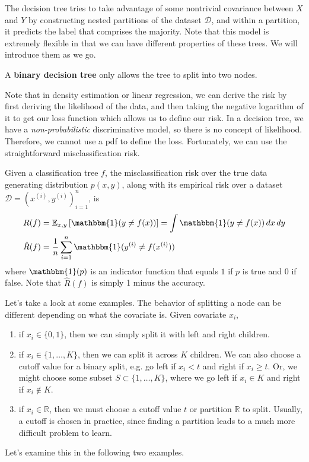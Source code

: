   The decision tree tries to take advantage of some nontrivial covariance between $X$ and $Y$ by constructing nested partitions of the dataset $\mathcal{D}$, and within a partition, it predicts the label that comprises the majority. Note that this model is extremely flexible in that we can have different properties of these trees. We will introduce them as we go. 

  \begin{definition}
    A \textbf{binary decision tree} only allows the tree to split into two nodes. 
  \end{definition} 

  Note that in density estimation or linear regression, we can derive the risk by first deriving the likelihood of the data, and then taking the negative logarithm of it to get our loss function which allows us to define our risk. In a decision tree, we have a \textit{non-probabilistic} discriminative model, so there is no concept of likelihood. Therefore, we cannot use a pdf to define the loss. Fortunately, we can use the straightforward misclassification risk. 

  \begin{theorem}
    Given a classification tree $f$, the misclassification risk over the true data generating distribution $p(x, y)$, along with its empirical risk over a dataset $\mathcal{D} = (x^{(i)}, y^{(i)})_{i=1}^n$, is 
    \begin{align}
      R(f) & = \mathbb{E}_{x, y} \left[ \mathbbm{1} (y \neq f(x))\right] = \int \mathbbm{1} (y \neq f(x)) \, dx \,dy \\ 
      \hat{R}(f) & = \frac{1}{n} \sum_{i=1}^n \mathbbm{1} (y^{(i)} \neq f(x^{(i)}))
    \end{align}
    where $\mathbbm{1}(p)$ is an indicator function that equals $1$ if $p$ is true and $0$ if false. Note that $\hat{R}(f)$ is simply 1 minus the accuracy. 
  \end{theorem} 

  Let's take a look at some examples. The behavior of splitting a node can be different depending on what the covariate is. Given covariate $x_i$, 
  \begin{enumerate}
    \item if $x_i \in \{0, 1\}$, then we can simply split it with left and right children. 
    \item if $x_i \in \{1, \ldots, K\}$, then we can split it across $K$ children. We can also choose a cutoff value for a binary split, e.g. go left if $x_i < t$ and right if $x_i \geq t$. Or, we might choose some subset $S \subset \{1, \ldots, K\}$, where we go left if $x_i \in K$ and right if $x_i \not\in K$. 
    \item if $x_i \in \mathbb{R}$, then we must choose a cutoff value $t$ or partition $\mathbb{R}$ to split. Usually, a cutoff is chosen in practice, since finding a partition leads to a much more difficult problem to learn. 
  \end{enumerate}
  Let's examine this in the following two examples. 

